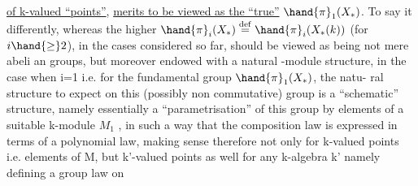 \uline{of k-valued ``points''},  \uline{merits to be viewed as the ``true''} $\hand{\pi}_1(X_*)$. To say
it differently, whereas the higher $\hand{\pi}_i(X_*) \overset{\mathrm{def}}{=} \hand{\pi}_i(X_*(k))$  (for $i\hand{\geq} 2$),
in the cases considered so far, should be viewed as being not mere abeli
\hand{-}an groups, but moreover endowed with a natural -module structure,
in the case when i=1 i.e. for the fundamental group $\hand{\pi}_1(X_*)$, the natu-%
ral structure to expect on this (possibly non commutative) group is a
 ``schematic'' structure, namely essentially a  ``parametrisation'' of this
group by elements of a suitable k-module $M_1$ , in such a way that the
composition law is expressed in terms of a polynomial law, making sense
therefore not only for k-valued points i.e.  elements of M, but  k'-valued
points as well \hand{(}for any k-algebra k'\hand{),} namely defining a group law on


